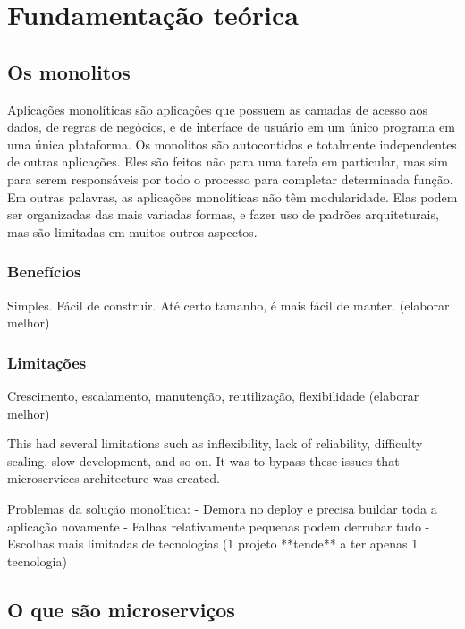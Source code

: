 \chapter{Fundamentação teórica}\label{cap_exemplos}


\section{Os monolitos}

Aplicações monolíticas são aplicações que possuem as camadas de acesso aos dados, de regras de negócios, e de interface de usuário em um único programa em uma única plataforma. Os monolitos são autocontidos e totalmente independentes de outras aplicações. Eles são feitos não para uma tarefa em particular, mas sim para serem responsáveis por todo o processo para completar determinada função. Em outras palavras, as aplicações monolíticas não têm modularidade. Elas podem ser organizadas das mais variadas formas, e fazer uso de padrões arquiteturais, mas são limitadas em muitos outros aspectos.

\subsection{Benefícios}

Simples. Fácil de construir. Até certo tamanho, é mais fácil de manter. (elaborar melhor)

\subsection{Limitações}

Crescimento, escalamento, manutenção, reutilização, flexibilidade (elaborar melhor)

This had several limitations such as inflexibility, lack of reliability, difficulty scaling, slow development, and so on. It was to bypass these issues that microservices architecture was created.

Problemas da solução monolítica:
- Demora no deploy e precisa buildar toda a aplicação novamente
- Falhas relativamente pequenas podem derrubar tudo
- Escolhas mais limitadas de tecnologias (1 projeto **tende** a ter apenas 1 tecnologia)

\section{O que são microserviços}

